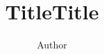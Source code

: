 \documentclass{article}
\title{Title}
\author{Author}
\begin{document}
\title{Title}
\maketitle
\end{document}
